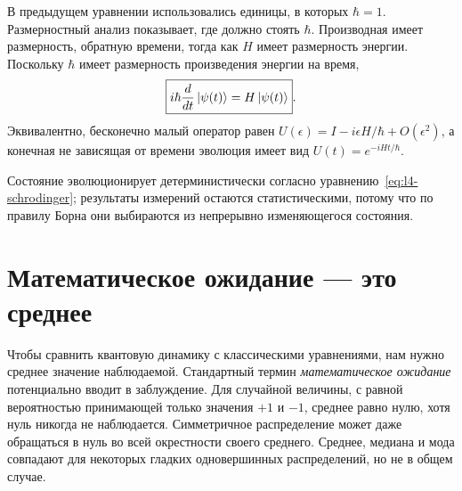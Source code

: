 В предыдущем уравнении использовались единицы, в которых \(\hbar=1\). Размерностный анализ показывает, где должно стоять \(\hbar\). Производная имеет размерность, обратную времени, тогда как \(H\) имеет размерность энергии. Поскольку \(\hbar\) имеет размерность произведения энергии на время,
\begin{equation}
\boxed{i\hbar\frac{d}{dt}\left\lvert\psi(t)\right\rangle=H\left\lvert\psi(t)\right\rangle}.
\label{eq:l4-schrodinger}
\end{equation}
Эквивалентно, бесконечно малый оператор равен \(U(\epsilon)=I-i\epsilon H/\hbar+O(\epsilon^2)\), а конечная не зависящая от времени эволюция имеет вид \(U(t)=e^{-iHt/\hbar}\).

\begin{classroomqa}
\end{classroomqa}

Состояние эволюционирует детерминистически согласно уравнению~\eqref{eq:l4-schrodinger}; результаты измерений остаются статистическими, потому что по правилу Борна они выбираются из непрерывно изменяющегося состояния.

\begin{classroomqa}
\end{classroomqa}

\section{Математическое ожидание — это среднее}

Чтобы сравнить квантовую динамику с классическими уравнениями, нам нужно среднее значение наблюдаемой. Стандартный термин \emph{математическое ожидание} потенциально вводит в заблуждение. Для случайной величины, с равной вероятностью принимающей только значения \(+1\) и \(-1\), среднее равно нулю, хотя нуль никогда не наблюдается. Симметричное распределение может даже обращаться в нуль во всей окрестности своего среднего. Среднее, медиана и мода совпадают для некоторых гладких одновершинных распределений, но не в общем случае.


